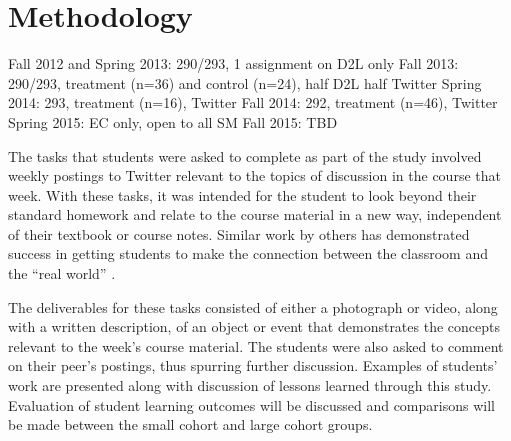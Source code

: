 \documentclass[12pt]{article}
\begin{document}
\section*{Methodology}
Fall 2012 and Spring 2013: 290/293, 1 assignment on D2L only
Fall 2013: 290/293, treatment (n=36) and control (n=24), half D2L half Twitter
Spring 2014: 293, treatment (n=16), Twitter
Fall 2014: 292, treatment (n=46), Twitter
Spring 2015: EC only, open to all SM
Fall 2015: TBD

The tasks that students were asked to complete as part of the study involved weekly postings to Twitter relevant to the topics of discussion in the course that week. With these tasks, it was intended for the student to look beyond their standard homework and relate to the course material in a new way, independent of their textbook or course notes. Similar work by others has demonstrated success in getting students to make the connection between the classroom and the “real world” \cite{hopp_journal_2008}.

The deliverables for these tasks consisted of either a photograph or video, along with a written description, of an object or event that demonstrates the concepts relevant to the week’s course material. The students were also asked to comment on their peer's postings, thus spurring further discussion. Examples of students’ work are presented along with discussion of lessons learned through this study. Evaluation of student learning outcomes will be discussed and comparisons will be made between the small cohort and large cohort groups.

\vspace{4\baselineskip}\vspace{-\parskip} %
\footnotesize %


\end{document}
